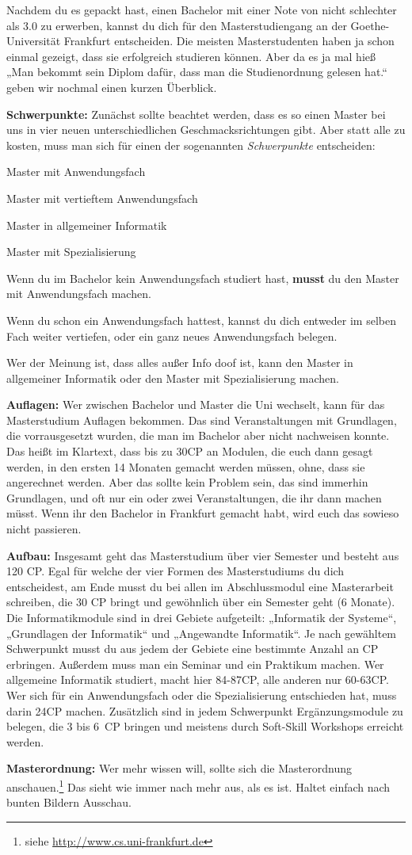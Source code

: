 \spaltenanfang
Nachdem du es gepackt hast, einen Bachelor mit einer Note von nicht schlechter als 3.0 zu erwerben, kannst du dich für den Masterstudiengang an der Goethe-Universität Frankfurt entscheiden.
Die meisten Masterstudenten haben ja schon einmal gezeigt, dass sie
erfolgreich studieren k\"onnen. Aber da es ja mal hie{\ss} „Man bekommt sein Diplom
daf\"ur, dass man die Studienordnung gelesen hat.“ geben wir nochmal einen
kurzen \"Uberblick.

\textbf{Schwerpunkte:}
Zun\"achst sollte beachtet werden, dass es so einen Master bei uns in vier neuen unterschiedlichen Geschmacksrichtungen gibt. Aber statt alle zu kosten, muss man sich f\"ur einen der sogenannten \emph{Schwerpunkte} entscheiden:
\begin{noindEnumerate}
\item Master mit Anwendungsfach
\item Master mit vertieftem Anwendungsfach
\item Master in allgemeiner Informatik
\item Master mit Spezialisierung
\end{noindEnumerate}

Wenn du im Bachelor kein Anwendungsfach studiert hast, \textbf{musst} du den Master mit Anwendungsfach machen.

Wenn du schon ein Anwendungsfach hattest, kannst du dich entweder im selben Fach weiter vertiefen, oder ein ganz neues Anwendungsfach belegen.

Wer der Meinung ist, dass alles au{\ss}er Info doof ist, kann den Master in allgemeiner Informatik oder den Master mit Spezialisierung machen. 

\textbf{Auflagen:}
Wer zwischen Bachelor und Master die Uni wechselt, kann f\"ur das Masterstudium Auflagen bekommen.
Das sind Veranstaltungen mit Grundlagen, die vorrausgesetzt wurden, die man im Bachelor aber nicht nachweisen konnte.
Das hei{\ss}t im Klartext, dass bis zu 30CP an Modulen, die euch dann gesagt werden, in den ersten 14 Monaten gemacht werden m\"ussen, ohne, dass sie angerechnet werden. Aber das sollte kein Problem sein, das sind immerhin Grundlagen, und oft nur ein oder zwei Veranstaltungen, die ihr dann machen m\"usst. Wenn ihr den Bachelor in Frankfurt gemacht habt, wird euch das sowieso nicht passieren.

\textbf{Aufbau:}
Insgesamt geht das Masterstudium über vier Semester und besteht aus 120 CP.
Egal für welche der vier Formen des Masterstudiums du dich entscheidest, am Ende musst du bei allen im Abschlussmodul eine Masterarbeit schreiben, die 30 CP bringt und gewöhnlich über ein Semester geht (6 Monate).
Die Informatikmodule sind in drei Gebiete aufgeteilt: „Informatik der Systeme“, „Grundlagen der Informatik“ und „Angewandte Informatik“. Je nach gewähltem Schwerpunkt musst du aus jedem der Gebiete eine bestimmte Anzahl an CP erbringen. Au{\ss}erdem muss man ein Seminar und ein Praktikum machen. Wer allgemeine Informatik studiert, macht hier 84-87CP, alle anderen nur 60-63CP.
Wer sich f\"ur ein Anwendungsfach oder die Spezialisierung entschieden hat, muss darin 24CP machen.
Zusätzlich sind in jedem Schwerpunkt Ergänzungsmodule zu belegen, die 3 bis 6~CP bringen und meistens durch Soft-Skill Workshops erreicht werden.

\textbf{Masterordnung:} Wer mehr wissen will, sollte sich die Masterordnung anschauen.\footnote{siehe \url{http://www.cs.uni-frankfurt.de}} Das sieht wie immer nach mehr aus, als es ist. Haltet einfach nach bunten Bildern Ausschau.

\spaltenende
